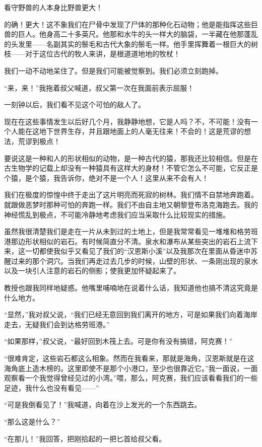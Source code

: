 \documentclass[10pt]{book}
\begin{document}
看守野兽的人本身比野兽更大！

的确！更大！这不象我们在尸骨中发现了尸体的那种化石动物；他是能指挥这些巨兽的巨人。他身高二十多英尺。他那和水牛的头一样大的脑袋，一半藏在他那蓬乱的头发里——名副其实的鬃毛和古代大象的鬃毛一样。他手里挥舞着一根巨大的树枝——对于这位古代的牧人来讲，是根道道地地的牧杖！

我们一动不动地呆住了。但是我们可能被觉察到。我们必须立刻跑掉。

“来，来！”我拖着叔父喊道，叔父第一次在我面前表示屈服！

一刻钟以后，我们看不见这个可怕的敌人了。

现在在这些事情发生以后好几个月，我静静地想，它是人吗？不，不可能！没有一个人能在这地下世界生存，并且跟地面上的人毫无往来！不会的！这是荒谬的想法，荒谬到极点！

要说这是一种和人的形状相似的动物，是一种古代的猿，那我还比较相信。但是在古生物学的记载上却没有一种猿具有这样大的身材！不管它怎么不可能，它反正是个猿，是个猿，我告诉你，绝对不是一个人！这里从来不会有人！

我们在极度的惊惶中终于走出了这片明亮而死寂的树林。我们情不自禁地奔跑着。就跟做恶梦时那种可怕的奔跑一样。我们不由自主地又朝黎登布洛克海跑去。我的神经慌乱到极点，不可能冷静地考虑我们应当采取什么比较现实的措施。

虽然我很清楚我们是走在一片从未到过的土地上，但是我常常看见一堆堆和格劳班港那边形状相似的岩石。有时候简直分不清。泉水和瀑布从某些突出的岩石上流下来，这一切都使我似乎又看见了我们的“汉恩斯小溪”以及我那次在里面从昏迷中苏醒过来的那个洞穴。当我们再走过去几步的时候，山壁的形状、一条刚出现的泉水以及一块引人注意的岩石的侧影；使我更加怀疑起来了。

教授也跟我同样地疑惑。他嘴里哺喃地在说着什么话，我知道他也搞不清这究竟是什么地方。

“显然，”我对叔父说，“我们已经无意回到我们离开的地方，可是如果我们向着海岸走去，无疑我们会到达格劳班港。”

“如果那样，”叔父说，“最好回到木筏上去。可是你有没有搞错，阿克赛！”

“很难肯定，这些岩石都这么相象。然而在我看来，那就是海角，汉恩斯就是在这海角底上造木榜的。这里即使不是那个小港口，至少也很靠近它。”我一面说，一面观察看一个我觉得曾经见过的小湾。”喂，那么，阿克赛，我们应该看看我们的一些足迹，我什么也没有看见——”

“可是我倒看见了！”我喊道，向着在沙上发光的一个东西跳去。

“那么这是什么？”

“在那儿！”我回答，把刚拾起的一把匕首给叔父看。
\end{document}
